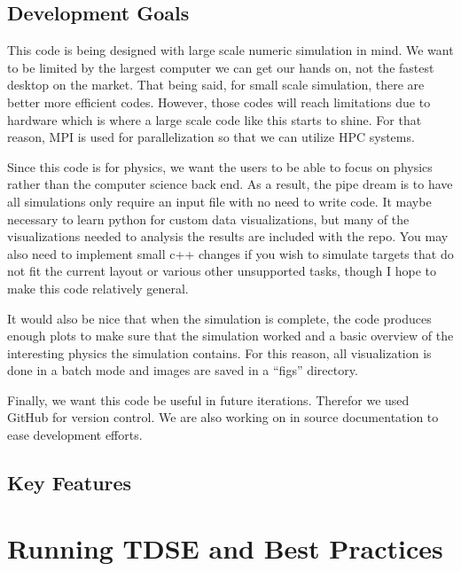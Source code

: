 \documentclass{article}
\begin{document}
\subsection{Development Goals} %
\label{sub:development_goals}
This code is being designed with large scale numeric simulation in mind. We want to be limited by the largest computer we can get our hands on, not the fastest desktop on the market. That being said, for small scale simulation, there are better more efficient codes. However, those codes will reach limitations due to hardware which is where a large scale code like this starts to shine. For that reason, MPI is used for parallelization so that we can utilize HPC systems.

Since this code is for physics, we want the users to be able to focus on physics rather than the computer science back end. As a result, the pipe dream is to have all simulations only require an input file with no need to write code. It maybe necessary to learn python for custom data visualizations, but many of the visualizations needed to analysis the results are included with the repo. You may also need to implement small c++ changes if you wish to simulate targets that do not fit the current layout or various other unsupported tasks, though I hope to make this code relatively general.

It would also be nice that when the simulation is complete, the code produces enough plots to make sure that the simulation worked and a basic overview of the interesting physics the simulation contains. For this reason, all visualization is done in a batch mode and images are saved in a ``figs'' directory.

Finally, we want this code be useful in future iterations. Therefor we used GitHub for version control. We are also working on in source documentation to ease development efforts.

\subsection{Key Features} %
\label{sub:key_features}


\section{Running TDSE and Best Practices} %
\label{sec:running_tdse_and_best_practices}
\end{document}
